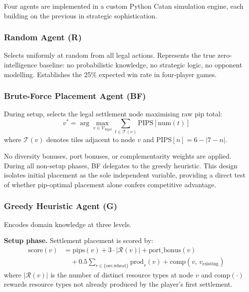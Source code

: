 \documentclass[12pt,a4paper]{article}
\begin{document}
{Four agents are implemented in a custom Python Catan simulation engine,
each building on the previous in strategic sophistication.

\subsubsection{Random Agent (R)}

Selects uniformly at random from all legal actions. Represents the
true zero-intelligence baseline: no probabilistic knowledge, no strategic
logic, no opponent modelling. Establishes the 25\% expected win rate
in four-player games.

\subsubsection{Brute-Force Placement Agent (BF)}

During setup, selects the legal settlement node maximising raw pip total:
\begin{equation}
  v^* = \arg\max_{v \in \mathcal{V}_{\text{legal}}}
  \sum_{t \in \mathcal{T}(v)} \text{PIPS}[\text{num}(t)]
  \label{eq:brute_force}
\end{equation}
where $\mathcal{T}(v)$ denotes tiles adjacent to node $v$ and
$\text{PIPS}[n] = 6 - |7-n|$.

No diversity bonuses, port bonuses, or complementarity weights are
applied. During all non-setup phases, BF delegates to the greedy
heuristic. This design isolates initial placement as the sole independent
variable, providing a direct test of whether pip-optimal placement alone
confers competitive advantage.

\subsubsection{Greedy Heuristic Agent (G)}

Encodes domain knowledge at three levels.

\textbf{Setup phase.} Settlement placement is scored by:
\begin{align}
  \text{score}(v) &= \text{pips}(v) + 3 \cdot |\mathcal{R}(v)| +
  \text{port\_bonus}(v) \nonumber \\
  &\quad + 0.5 \sum_{r \in \{\text{ore,wheat}\}} \text{prod}_r(v)
  + \text{comp}(v,\, v_{\text{existing}})
  \label{eq:setup_score}
\end{align}
where $|\mathcal{R}(v)|$ is the number of distinct resource types at
node $v$ and $\text{comp}(\cdot)$ rewards resource types not already
produced by the player's first settlement.

}
\end{document}
